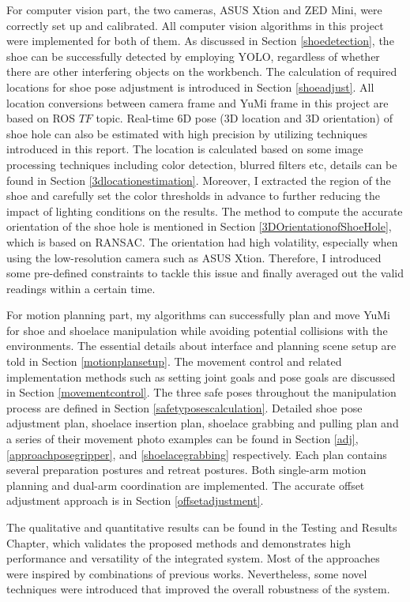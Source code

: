 For computer vision part, the two cameras, ASUS Xtion and ZED Mini, were correctly set up and calibrated. All computer vision algorithms in this project were implemented for both of them. As discussed in Section \ref{shoedetection}, the shoe can be successfully detected by employing YOLO, regardless of whether there are other interfering objects on the workbench. The calculation of required locations for shoe pose adjustment is introduced in Section \ref{shoeadjust}. All location conversions between camera frame and YuMi frame in this project are based on ROS $TF$ topic. Real-time 6D pose (3D location and 3D orientation) of shoe hole can also be estimated with high precision by utilizing techniques introduced in this report. The location is calculated based on some image processing techniques including color detection, blurred filters etc, details can be found in Section \ref{3dlocationestimation}. Moreover, I extracted the region of the shoe and carefully set the color thresholds in advance to further reducing the impact of lighting conditions on the results. The method to compute the accurate orientation of the shoe hole is mentioned in Section \ref{3DOrientationofShoeHole}, which is based on RANSAC. The orientation had high volatility, especially when using the low-resolution camera such as ASUS Xtion. Therefore, I introduced some pre-defined constraints to tackle this issue and finally averaged out the valid readings within a certain time.

For motion planning part, my algorithms can successfully plan and move YuMi for shoe and shoelace manipulation while avoiding potential collisions with the environments. The essential details about interface and planning scene setup are told in Section \ref{motionplansetup}. The movement control and related implementation methods such as setting joint goals and pose goals are discussed in Section \ref{movementcontrol}. The three safe poses throughout the manipulation process are defined in Section \ref{safetyposescalculation}. Detailed shoe pose adjustment plan, shoelace insertion plan, shoelace grabbing and pulling plan and a series of their movement photo examples can be found in Section \ref{adj}, \ref{approachposegripper}, and \ref{shoelacegrabbing} respectively. Each plan contains several preparation postures and retreat postures. Both single-arm motion planning and dual-arm coordination are implemented. The accurate offset adjustment approach is in Section \ref{offsetadjustment}.

The qualitative and quantitative results can be found in the Testing and Results Chapter, which validates the proposed methods and demonstrates high performance and versatility of the integrated system. Most of the approaches were inspired by combinations of previous works. Nevertheless, some novel techniques were introduced that improved the overall robustness of the system.

